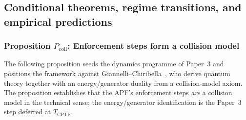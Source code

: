 \documentclass[11pt]{article}
\theoremstyle{remark}
\begin{document}


\subsection{Conditional theorems, regime transitions, and empirical predictions}
\label{sec:predictions}

\subsubsection*{Proposition $P_{\mathrm{coll}}$: Enforcement steps form a collision model}
\label{sec:collision_model}

\noindent The following proposition seeds the dynamics programme of Paper~3 and positions the framework against Giannelli--Chiribella~\cite{GianelliChiribella2024}, who derive quantum theory together with an energy/generator duality from a collision-model axiom.  The proposition establishes that the APF's enforcement steps \emph{are} a collision model in the technical sense; the energy/generator identification is the Paper~3 step deferred at $T_{\mathrm{CPTP}}$.
\end{document}
